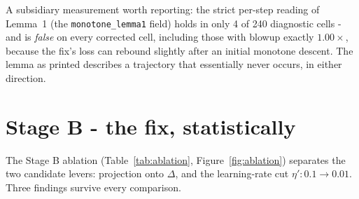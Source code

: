 \documentclass[11pt,a4paper]{report}
\begin{document}
A subsidiary measurement worth reporting: the strict per-step reading of
Lemma~1 (the \texttt{monotone\_lemma1} field) holds in only 4 of 240
diagnostic cells - and is \emph{false} on every corrected cell, including
those with blowup exactly $1.00\times$, because the fix's loss can rebound
slightly after an initial monotone descent. The lemma as printed describes
a trajectory that essentially never occurs, in either direction.

\section{Stage B - the fix, statistically}
\label{sec:stageb}

The Stage B ablation (Table~\ref{tab:ablation},
Figure~\ref{fig:ablation}) separates the
two candidate levers: projection onto $\Delta$, and the learning-rate cut
$\eta': 0.1 \to 0.01$. Three findings survive every comparison.
\end{document}
